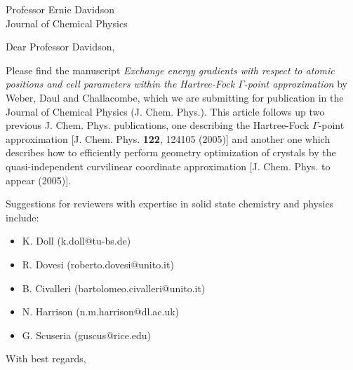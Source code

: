 
\pagestyle{empty}

\signature{V. Weber}

\address{
V. Weber \\
(valeryw@lanl.gov) \\
Theoretical Division \\
Group T-12, MS B268 \\
Los Alamos National Laboratory \\
Los Alamos, NM 87545 }

\date{November 30, 2005}

\begin{letter}{
Professor Ernie Davidson\\
Journal of Chemical Physics
}

\opening{Dear Professor Davidson,}

Please find the manuscript {\em Exchange energy gradients with respect 
to atomic positions and cell parameters within the Hartree-Fock 
$\Gamma$-point approximation} by Weber, Daul and Challacombe, which we are 
submitting for publication in the Journal of Chemical Physics (J. Chem. Phys.). 
This article follows up two previous J. Chem. Phys. publications, one 
describing the Hartree-Fock $\Gamma$-point approximation [J. Chem. Phys. {\bf 122}, 124105 (2005)] 
and another one which describes how to efficiently perform geometry optimization of crystals by the 
quasi-independent curvilinear coordinate approximation [J. Chem. Phys. to appear (2005)].

Suggestions for reviewers with expertise in solid state chemistry and physics include: 
\begin{itemize}
\item K. Doll (k.doll@tu-bs.de)
\item R. Dovesi (roberto.dovesi@unito.it)
\item B. Civalleri (bartolomeo.civalleri@unito.it)
\item N. Harrison (n.m.harrison@dl.ac.uk)
\item G. Scuseria (guscus@rice.edu)
\end{itemize}


\closing{With best regards,}
\end{letter}

